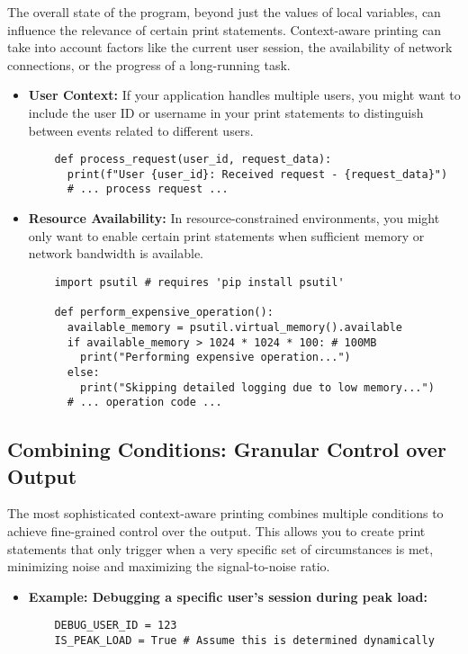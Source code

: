 \documentclass{article}
\begin{document}
{{{The overall state of the program, beyond just the values of local variables, can influence the relevance of certain print statements.  Context-aware printing can take into account factors like the current user session, the availability of network connections, or the progress of a long-running task.

\begin{itemize}
    \item \textbf{User Context:} If your application handles multiple users, you might want to include the user ID or username in your print statements to distinguish between events related to different users.
    \begin{verbatim}
    def process_request(user_id, request_data):
      print(f"User {user_id}: Received request - {request_data}")
      # ... process request ...
    \end{verbatim}
    \item \textbf{Resource Availability:} In resource-constrained environments, you might only want to enable certain print statements when sufficient memory or network bandwidth is available.
    \begin{verbatim}
    import psutil # requires 'pip install psutil'

    def perform_expensive_operation():
      available_memory = psutil.virtual_memory().available
      if available_memory > 1024 * 1024 * 100: # 100MB
        print("Performing expensive operation...")
      else:
        print("Skipping detailed logging due to low memory...")
      # ... operation code ...
    \end{verbatim}
\end{itemize}

\subsection*{Combining Conditions: Granular Control over Output}

The most sophisticated context-aware printing combines multiple conditions to achieve fine-grained control over the output.  This allows you to create print statements that only trigger when a very specific set of circumstances is met, minimizing noise and maximizing the signal-to-noise ratio.

\begin{itemize}
    \item \textbf{Example: Debugging a specific user's session during peak load:}
    \begin{verbatim}
    DEBUG_USER_ID = 123
    IS_PEAK_LOAD = True # Assume this is determined dynamically


\end{verbatim}
\end{itemize}}}}
\end{document}
